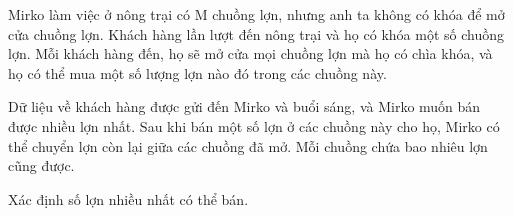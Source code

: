 Mirko làm việc ở nông trại có M chuồng lợn, nhưng anh ta không có khóa  để mở cửa chuồng lợn. Khách hàng lần lượt đến nông trại và họ có khóa một số chuồng lợn. Mỗi khách hàng đến, họ sẽ mở cửa mọi chuồng lợn mà họ có chìa khóa, và  họ có thể mua một số lượng lợn nào đó trong các chuồng này.  

   Dữ liệu về khách hàng được gửi đến Mirko và buổi sáng, và Mirko muốn bán  được nhiều lợn nhất. Sau khi bán một số lợn ở các chuồng này cho họ, Mirko có thể  chuyển lợn còn lại giữa các chuồng đã mở.  Mỗi chuồng chứa bao nhiêu lợn cũng được.  

   Xác định số lợn nhiều nhất có thể bán.  



\